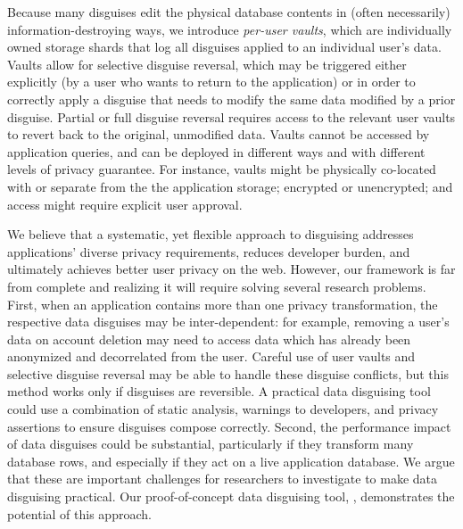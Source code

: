 Because many disguises edit the physical database contents in (often necessarily)
information-destroying ways, we introduce \emph{per-user vaults}, which are
individually owned storage shards that log all disguises applied to an individual user's data.
Vaults allow for selective disguise reversal, which may be triggered either explicitly (\eg by a user who
wants to return to the application) or in order to correctly apply a disguise that
needs to modify the same data modified by a prior disguise. Partial or full disguise reversal
requires access to the relevant user vaults to revert back to the original, unmodified data.
%
Vaults cannot be accessed by application queries, and can be deployed in different
ways and with different levels of privacy guarantee.
%
For instance, vaults might be physically co-located with or separate from the the
application storage; encrypted or unencrypted; and access might require explicit
user approval.
%

%

%
We believe that a systematic, yet flexible approach to disguising addresses applications'
diverse privacy requirements, reduces developer burden, and ultimately achieves better user privacy on
the web.
%
However, our framework is far from complete and realizing it will require solving several research
problems.
%
First, when an application contains more than one privacy transformation, the respective data
disguises may be inter-dependent: for example, removing a user's data on account deletion may need
to access data which has already been anonymized and decorrelated from the user. Careful use of user
vaults and selective disguise reversal may be able to handle these disguise conflicts, but this
method works only if disguises are reversible.
%
A practical data disguising tool could use a combination of static analysis, warnings to
developers, and privacy assertions to ensure disguises compose correctly.
%
Second, the performance impact of data disguises could be substantial, particularly if they
transform many database rows, and especially if they act on a live application database.
%
We argue that these are important challenges for researchers to investigate to make data
disguising practical.
%
Our proof-of-concept data disguising tool, \sys, demonstrates the potential of this
approach.
%
%
%
%
%
%
